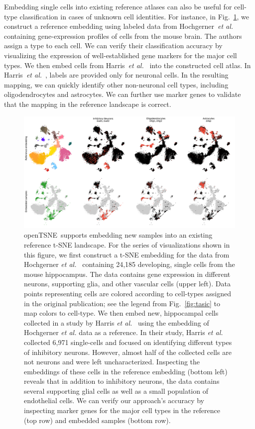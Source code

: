 \documentclass[letter]{article}
\newcommand{\opentsne}{\textsf{openTSNE}}
\begin{document}
Embedding single cells into existing reference atlases can also be useful for
cell-type classification in cases of unknown cell identities. For instance, in
Fig.~\ref{fig:transform}, we construct a reference embedding using labeled data
from Hochgerner~\textit{et al.}~\cite{hochgerner2018conserved} containing
gene-expression profiles of cells from the mouse brain. The authors assign a
type to each cell. We can verify their classification accuracy by visualizing
the expression of well-established gene markers for the major cell types. We
then embed cells from Harris~\textit{et al.}~\cite{harris2018classes} into the
constructed cell atlas. In Harris~\textit{et al.}~, labels are provided only for
neuronal cells. In the resulting mapping, we can quickly identify other
non-neuronal cell types, including oligodendrocytes and astrocytes. We can
further use marker genes to validate that the mapping in the reference landscape
is correct. 

\begin{figure}[htbp]
  \includegraphics[width=\textwidth]{transform_hochgerner}
  \caption{\label{fig:transform}
  \opentsne\ supports embedding new samples into an existing reference t-SNE
	landscape. For the series of visualizations shown in this figure, we
	first construct a t-SNE embedding for the data from Hochgerner
	\textit{et al.}~\cite{hochgerner2018conserved} containing 24,185
	developing, single cells from the mouse hippocampus. The data contains
	gene expression in different neurons, supporting glia, and other
	vascular cells (upper left). Data points representing cells are colored
	according to cell-types assigned in the original publication; see the
	legend from Fig.~\ref{fig:tasic} to map colors to cell-type. We then
	embed new, hippocampal cells collected in a study by Harris \textit{et
	al.}~\cite{harris2018classes} using the embedding of Hochgerner
	\textit{et al.} data as a reference. In their study, Harris \textit{et
	al.} collected 6,971 single-cells and focused on identifying different
	types of inhibitory neurons. However, almost half of the collected cells
	are not neurons and were left uncharacterized. Inspecting the embeddings
	of these cells in the reference embedding (bottom left) reveals that in
	addition to inhibitory neurons, the data contains several supporting
	glial cells as well as a small population of endothelial cells. We can
	verify our approach's accuracy by inspecting marker genes for the major
	cell types in the reference (top row) and embedded samples (bottom row).
}
\end{figure}
\end{document}
